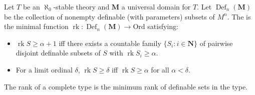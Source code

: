 Let $T$ be an $\aleph_0$-stable theory and $\mathbf{M}$ a universal domain for $T$. Let $\operatorname{Def}_n(\mathbf{M})$ be the collection of nonempty definable (with parameters) subsets of $M^n$. The  is the minimal function $\operatorname{rk} : \operatorname{Def}_n(\mathbf{M}) \to \mathrm{Ord}$ satisfying:
\begin{itemize}
\item $\operatorname{rk} S \geq \alpha + 1$ iff there exists a countable family $\{S_i : i \in \mathbf{N}\}$ of pairwise disjoint definable subsets of $S$ with $\operatorname{rk} S_i \geq \alpha$.
\item For a limit ordinal $\delta$, $\operatorname{rk} S \geq \delta$ iff $\operatorname{rk} S \geq \alpha$ for all $\alpha < \delta$.
\end{itemize}
The rank of a complete type is the minimum rank of definable sets in the type.
